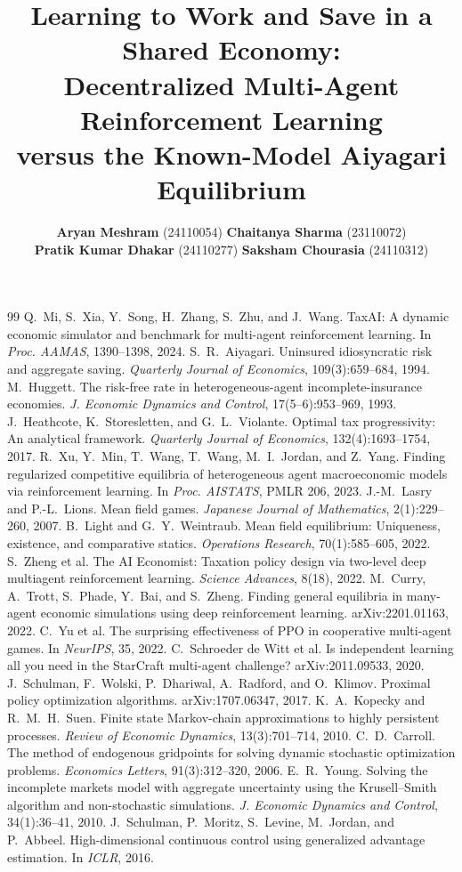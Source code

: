 \documentclass{article}
\title{Learning to Work and Save in a Shared Economy:\\
Decentralized Multi-Agent Reinforcement Learning\\
versus the Known-Model Aiyagari Equilibrium}
\author{%
\textbf{Aryan Meshram} (24110054)\quad
\textbf{Chaitanya Sharma} (23110072)\\
\textbf{Pratik Kumar Dhakar} (24110277)\quad
\textbf{Saksham Chourasia} (24110312)}
\begin{document}
\maketitle










\begin{thebibliography}{99}\small\setlength{\itemsep}{0pt}
 Q.~Mi, S.~Xia, Y.~Song, H.~Zhang, S.~Zhu, and J.~Wang. TaxAI: A dynamic economic simulator and benchmark for multi-agent reinforcement learning. In \emph{Proc. AAMAS}, 1390--1398, 2024.
 S.~R.~Aiyagari. Uninsured idiosyncratic risk and aggregate saving. \emph{Quarterly Journal of Economics}, 109(3):659--684, 1994.
 M.~Huggett. The risk-free rate in heterogeneous-agent incomplete-insurance economies. \emph{J. Economic Dynamics and Control}, 17(5--6):953--969, 1993.
 J.~Heathcote, K.~Storesletten, and G.~L.~Violante. Optimal tax progressivity: An analytical framework. \emph{Quarterly Journal of Economics}, 132(4):1693--1754, 2017.
 R.~Xu, Y.~Min, T.~Wang, T.~Wang, M.~I.~Jordan, and Z.~Yang. Finding regularized competitive equilibria of heterogeneous agent macroeconomic models via reinforcement learning. In \emph{Proc. AISTATS}, PMLR 206, 2023.
 J.-M.~Lasry and P.-L.~Lions. Mean field games. \emph{Japanese Journal of Mathematics}, 2(1):229--260, 2007.
 B.~Light and G.~Y.~Weintraub. Mean field equilibrium: Uniqueness, existence, and comparative statics. \emph{Operations Research}, 70(1):585--605, 2022.
 S.~Zheng et al. The AI Economist: Taxation policy design via two-level deep multiagent reinforcement learning. \emph{Science Advances}, 8(18), 2022.
 M.~Curry, A.~Trott, S.~Phade, Y.~Bai, and S.~Zheng. Finding general equilibria in many-agent economic simulations using deep reinforcement learning. arXiv:2201.01163, 2022.
 C.~Yu et al. The surprising effectiveness of PPO in cooperative multi-agent games. In \emph{NeurIPS}, 35, 2022.
 C.~Schroeder de Witt et al. Is independent learning all you need in the StarCraft multi-agent challenge? arXiv:2011.09533, 2020.
 J.~Schulman, F.~Wolski, P.~Dhariwal, A.~Radford, and O.~Klimov. Proximal policy optimization algorithms. arXiv:1707.06347, 2017.
 K.~A.~Kopecky and R.~M.~H.~Suen. Finite state Markov-chain approximations to highly persistent processes. \emph{Review of Economic Dynamics}, 13(3):701--714, 2010.
 C.~D.~Carroll. The method of endogenous gridpoints for solving dynamic stochastic optimization problems. \emph{Economics Letters}, 91(3):312--320, 2006.
 E.~R.~Young. Solving the incomplete markets model with aggregate uncertainty using the Krusell--Smith algorithm and non-stochastic simulations. \emph{J. Economic Dynamics and Control}, 34(1):36--41, 2010.
 J.~Schulman, P.~Moritz, S.~Levine, M.~Jordan, and P.~Abbeel. High-dimensional continuous control using generalized advantage estimation. In \emph{ICLR}, 2016.
\end{thebibliography}
\end{document}
